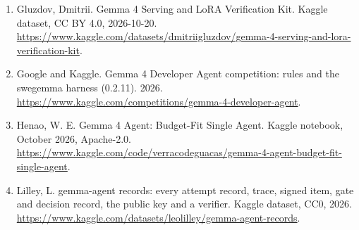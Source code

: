 \documentclass[
  11pt,
  a4paper,
]{article}
\begin{document}
\begin{enumerate}
  2026.
  \url{https://www.kaggle.com/code/dmitriigluzdov/gemma-4-measure-before-you-tune}.
\item
  Gluzdov, Dmitrii. Gemma 4 Serving and LoRA Verification Kit. Kaggle
  dataset, CC BY 4.0, 2026-10-20.
  \url{https://www.kaggle.com/datasets/dmitriigluzdov/gemma-4-serving-and-lora-verification-kit}.
\item
  Google and Kaggle. Gemma 4 Developer Agent competition: rules and the
  swegemma harness (0.2.11). 2026.
  \url{https://www.kaggle.com/competitions/gemma-4-developer-agent}.
\item
  Henao, W. E. Gemma 4 Agent: Budget-Fit Single Agent. Kaggle notebook,
  October 2026, Apache-2.0.
  \url{https://www.kaggle.com/code/verracodeguacas/gemma-4-agent-budget-fit-single-agent}.
\item
  Lilley, L. gemma-agent records: every attempt record, trace, signed
  item, gate and decision record, the public key and a verifier. Kaggle
  dataset, CC0, 2026.
  \url{https://www.kaggle.com/datasets/leolilley/gemma-agent-records}.
\end{enumerate}
\end{document}
